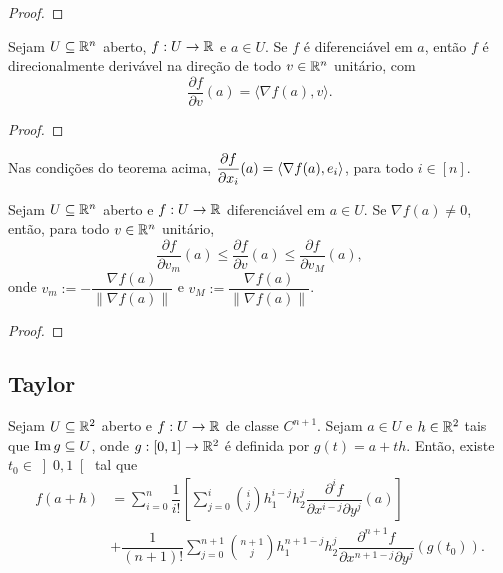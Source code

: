 \begin{proof}
    \blackproof
\end{proof}

\begin{theorem}
    Sejam $U \subseteq \mathbb{R}^n$ aberto, $f : U \to \mathbb{R}$ e $a \in U$. Se $f$ é diferenciável em $a$, então $f$ é direcionalmente derivável na direção de todo $v \in \mathbb{R}^n$ unitário, com
        \[
            \dfrac{\partial f}{\partial v}(a) = \langle \nabla f(a), v \rangle.
        \]
\end{theorem}

\begin{proof}
    \blackproof
\end{proof}

\begin{corollary}
    Nas condições do teorema acima, $\displaystyle \dfrac{\partial f}{\partial x_i}(a) = \langle \nabla f(a), e_i \rangle$, para todo $i \in [n]$. 
\end{corollary}

\begin{theorem}
    Sejam $U \subseteq \mathbb{R}^n$ aberto e $f : U \to \mathbb{R}$ diferenciável em $a \in U$. Se $\nabla f(a) \neq 0$, então, para todo $v \in \mathbb{R}^n$ unitário,
        \[
            \dfrac{\partial f}{\partial v_m}(a) \leq \dfrac{\partial f}{\partial v}(a) \leq \dfrac{\partial f}{\partial v_M}(a), 
        \]
    onde $v_m := - \dfrac{\nabla f(a)}{\| \nabla f(a) \|}$ e $v_M := \dfrac{ \nabla f(a)}{\| \nabla f(a) \|}$.
\end{theorem}

\begin{proof}
    \blackproof
\end{proof}

\subsection{Taylor}

\begin{theorem}
    Sejam $U \subseteq \mathbb{R}^2$ aberto e $f : U \to \mathbb{R}$ de classe $C^{n+1}$. Sejam $a \in U$ e $h \in \mathbb{R}^2$ tais que $\operatorname{Im} g \subseteq U$, onde $g : [0,1] \to \mathbb{R}^2$ é definida por $g(t) = a+th$. Então, existe $t_0 \in \left]0,1 \right[$ tal que
        \begin{align*}
            f(a+h) &= \sum_{i=0}^{n} \dfrac{1}{i!} \left[ \sum_{j=0}^{i} \binom{i}{j} h_1^{i-j} h_2^j \dfrac{\partial^i f}{\partial x^{i-j} \partial y^j} (a) \right] \\
            &+ \dfrac{1}{(n+1)!} \sum_{j=0}^{n+1} \binom{n+1}{j} h_1^{n+1-j} h_2^j \dfrac{\partial^{n+1} f}{\partial x^{n+1-j} \partial y^j} (g(t_0)).
        \end{align*}
\end{theorem}

